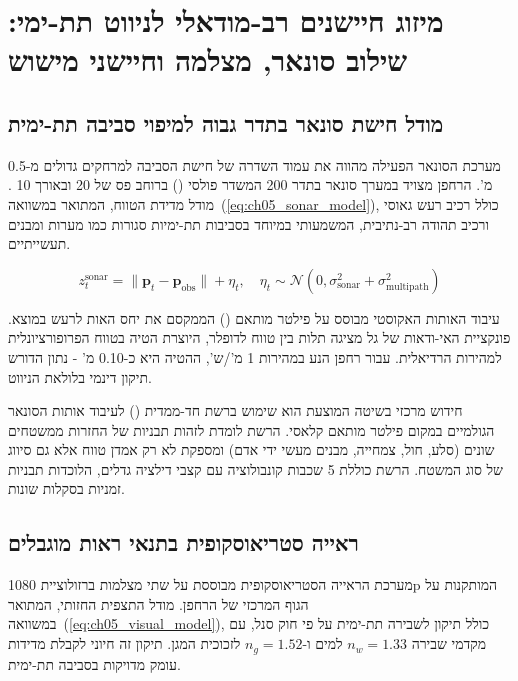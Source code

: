 

\section{מיזוג חיישנים רב-מודאלי לניווט תת-ימי: שילוב סונאר, מצלמה וחיישני מישוש}
\label{sec:ch05_sensor_fusion}

\subsection{מודל חישת סונאר בתדר גבוה למיפוי סביבה תת-ימית}
\label{sec:ch05_sonar}

מערכת הסונאר הפעילה מהווה את עמוד השדרה של חישת הסביבה למרחקים גדולים מ-0.5 מ'. הרחפן מצויד במערך סונאר בתדר 200  המשדר פולסי  () ברוחב פס של 20  ובאורך 10 . מודל מדידת הטווח, המתואר במשוואה~(\ref{eq:ch05_sonar_model}), כולל רכיב רעש גאוסי ורכיב תהודה רב-נתיבית, המשמעותי במיוחד בסביבות תת-ימיות סגורות כמו מערות ומבנים תעשייתיים.

\begin{equation}
z_t^{\text{sonar}} = \|\mathbf{p}_t - \mathbf{p}_{\text{obs}}\| + \eta_t, \quad \eta_t \sim \mathcal{N}(0, \sigma_{\text{sonar}}^2 + \sigma_{\text{multipath}}^2)
\label{eq:ch05_sonar_model}
\end{equation}

עיבוד האותות האקוסטי מבוסס על פילטר מותאם () הממקסם את יחס האות לרעש במוצא. פונקציית האי-ודאות של גל  מציגה תלות בין טווח לדופלר, היוצרת הטיה בטווח הפרופורציונלית למהירות הרדיאלית. עבור רחפן הנע במהירות 1 מ'/ש', ההטיה היא כ-0.10 מ' - נתון הדורש תיקון דינמי בלולאת הניווט.

חידוש מרכזי בשיטה המוצעת הוא שימוש ברשת  חד-ממדית () לעיבוד אותות הסונאר הגולמיים במקום פילטר מותאם קלאסי. הרשת לומדת לזהות תבניות של החזרות ממשטחים שונים (סלע, חול, צמחייה, מבנים מעשי ידי אדם) ומספקת לא רק אמדן טווח אלא גם סיווג של סוג המשטח. הרשת כוללת 5 שכבות קונבולוציה עם קצבי דילציה גדלים, הלוכדות תבניות זמניות בסקלות שונות.

\subsection{ראייה סטריאוסקופית בתנאי ראות מוגבלים}
\label{sec:ch05_vision}

מערכת הראייה הסטריאוסקופית מבוססת על שתי מצלמות ברזולוציית 1080p המותקנות על הגוף המרכזי של הרחפן. מודל התצפית החזותי, המתואר במשוואה~(\ref{eq:ch05_visual_model}), כולל תיקון לשבירה תת-ימית על פי חוק סנל, עם מקדמי שבירה $n_w = 1.33$ למים ו-$n_g = 1.52$ לזכוכית המגן. תיקון זה חיוני לקבלת מדידות עומק מדויקות בסביבה תת-ימית.

